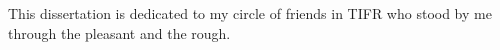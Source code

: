 
\begin{dedication} 

This dissertation is dedicated to my circle of friends in TIFR who stood by me through the pleasant and the rough.

\end{dedication}
